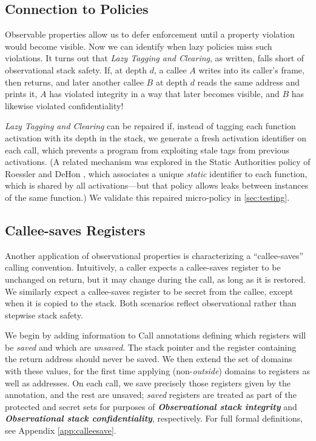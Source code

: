 \documentclass[10pt,conference]{ieeetran}%
\theoremstyle{definition}
\begin{document}
{\subsection{Connection to Policies}

Observable properties allow us to defer enforcement until a property
violation would become visible. Now we can identify when lazy policies
miss such violations. It turns out that {\em Lazy Tagging and Clearing},
as written, falls short of observational stack safety.
If, at depth \(d\), a callee \(A\) writes into its caller's
frame, then returns, and later another callee \(B\) at depth \(d\) reads the same
address and prints it, \(A\) has violated integrity in a way that later becomes visible,
and \(B\) has likewise violated confidentiality!

{\em Lazy Tagging and Clearing} can be repaired if, instead of tagging each function
activation with its depth in the stack, we generate a fresh activation
identifier on each call, which prevents a program from exploiting stale
tags from previous activations.
(A related mechanism was explored in the
Static Authorities policy of Roessler and DeHon \cite{DBLP:conf/sp/RoesslerD18}, which
associates a unique \emph{static} identifier to each function, which is shared
by all activations---but that policy allows leaks between
instances of the same function.) We validate this repaired micro-policy in
\ref{sec:testing}.

\subsection{Callee-saves Registers}
\label{sec:callee}

Another application of observational properties is characterizing a ``callee-saves''
calling convention. Intuitively, a caller expects a callee-saves register to be unchanged on
return, but it may change during the call, as long as it is restored. We similarly expect a callee-saves
register to be secret from the callee, except when it is copied to the stack. Both scenarios
reflect observational rather than stepwise stack safety.

We begin by adding information to Call annotations defining which registers will be {\em saved}
and which are {\em unsaved}. The stack pointer and the register containing the return address
should never be saved. We then extend the set of domains with these values, for the first time applying
(non-{\em outside}) domains to registers as well as addresses. On each call, we save precisely those
registers given by the annotation, and the rest are unsaved; {\em saved} registers are treated as part
of the protected and secret sets for purposes of \textbf{\em Observational stack integrity} and
\textbf{\em Observational stack confidentiality}, respectively. For full formal definitions, see
Appendix \ref{app:calleesave}.

}
\end{document}

